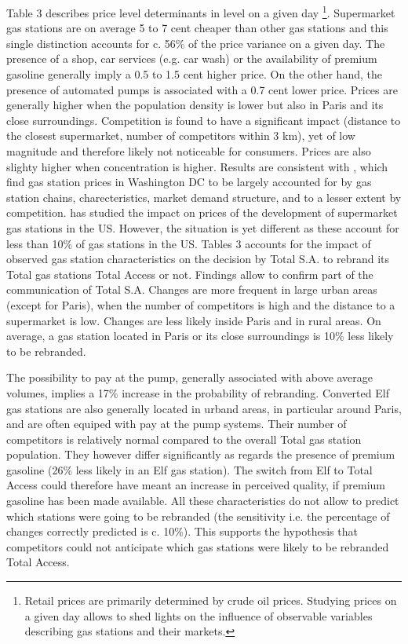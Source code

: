 \documentclass[english]{article}
\begin{document}
Table 3 describes price level determinants in level on a given day%
\footnote{Retail prices are primarily determined by crude oil prices. Studying prices on a given day allows to shed lights on the influence of observable variables describing gas stations and their markets.%
}. Supermarket gas stations are on average 5 to 7 cent cheaper than other gas stations and this single distinction accounts for c. 56\% of the price variance on a given day. The presence of a shop, car services (e.g. car wash) or the availability of premium gasoline generally imply a 0.5 to 1.5 cent higher price. On the other hand, the presence of 
automated pumps is associated with a 0.7 cent lower price. Prices are generally higher when the population density is lower but also in Paris and its close surroundings. Competition is found to have a significant impact (distance to the closest supermarket, number of competitors within 3 km), yet of low magnitude and therefore likely not noticeable for consumers. Prices are also slighty higher when concentration is higher. Results are consistent with \cite{HOS08}, 
which find gas station prices in Washington DC to be largely accounted for by gas station chains, charecteristics, market demand structure, and to a lesser extent by competition. \cite{ZIM12} has studied the impact on prices of the development of supermarket gas stations in the US. However, the situation is yet different as these account for less than 10\% of gas stations in the US. Tables 3 accounts for the impact of observed gas station characteristics on the decision by Total S.A. to rebrand its Total gas stations Total Access or not. Findings allow to confirm part of the communication of Total S.A. Changes are more frequent in large urban areas (except for Paris), when the number of competitors is high and the distance to a supermarket is low. Changes are less likely inside Paris and in rural areas. On average, a gas station located in Paris or its close surroundings is 10\% less likely to be rebranded.

The possibility to pay at the pump, generally associated with above average volumes, implies a 17\% increase in the probability of rebranding. Converted Elf gas stations are also generally located in urband areas, in particular around Paris, and are often equiped with pay at the pump systems. Their number of competitors is relatively normal compared to the overall Total gas station population. They however differ significantly as regards the presence of premium gasoline (26\% less likely in an Elf gas station). The switch from Elf to Total Access could therefore have meant an increase in perceived quality, if premium gasoline has been made available. All these characteristics do not allow to predict which stations were going to be rebranded (the sensitivity i.e. the percentage of changes correctly predicted is c. 10\%). This supports the hypothesis that competitors could not anticipate which gas stations were likely to be rebranded Total Access. \medskip{}
\end{document}
